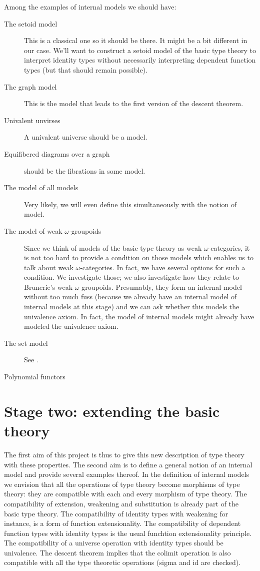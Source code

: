 Among the examples of internal models we should have:
\begin{description}
\item[The setoid model] This is a classical one so it should be there. It might
      be a bit different in our case. We'll want to construct a setoid model
      of the basic type theory to interpret identity types without necessarily
      interpreting dependent function types (but that should remain possible).
\item[The graph model] This is the model that leads to the first version of the
      descent theorem.
\item[Univalent unvirses] A univalent universe should be a model.
\item[Equifibered diagrams over a graph] should be the fibrations in some model.
\item[The model of all models] Very likely, we will even define this simultaneously
      with the notion of model.
\item[The model of weak $\omega$-groupoids] Since we think of models of the
      basic type theory as weak $\omega$-categories, it is not too hard to
      provide a condition on those models which enables us to talk about
      weak $\omega$-categories. In fact, we have several options for such a
      condition. We investigate those; we also investigate how they relate to
      Brunerie's weak $\omega$-groupoids. Presumably, they form an internal
      model without too much fuss (because we already have an internal model
      of internal models at this stage) and we can ask whether this models
      the univalence axiom. In fact, the model of internal models might already
      have modeled the univalence axiom. 
\item[The set model] See \cite{RijkeSpitters:Sets}.
\item[Polynomial functors]
\end{description}


\section{Stage two: extending the basic theory}
The first aim of this project is thus to give this new description of type
theory with these properties. The second aim is to define a general notion of
an internal model and provide several examples thereof. In the definition of
internal models we envision that all the operations of type theory become
morphisms of type theory: they are compatible with each and every morphism
of type theory. The compatibility of extension, weakening and substitution is
already part of the basic type theory. The compatibility of identity types
with weakening for instance, is a form of function extensionality. The 
compatibility of dependent function types with identity types is the usual
funchtion extensionality principle. The
compatibility of a universe operation with identity types should be univalence.
The descent theorem implies that the colimit operation is also compatible with
all the type theoretic operations (sigma and id are checked).


